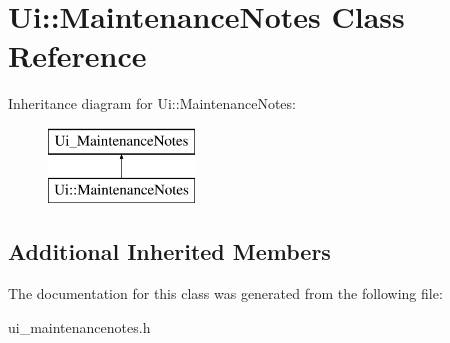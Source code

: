 \hypertarget{class_ui_1_1_maintenance_notes}{}\section{Ui\+:\+:Maintenance\+Notes Class Reference}
\label{class_ui_1_1_maintenance_notes}
Inheritance diagram for Ui\+:\+:Maintenance\+Notes\+:\begin{figure}[H]
\begin{center}
\leavevmode
\includegraphics[height=2.000000cm]{class_ui_1_1_maintenance_notes}
\end{center}
\end{figure}
\subsection*{Additional Inherited Members}


The documentation for this class was generated from the following file\+:\begin{DoxyCompactItemize}
\item 
ui\+\_\+maintenancenotes.\+h\end{DoxyCompactItemize}
